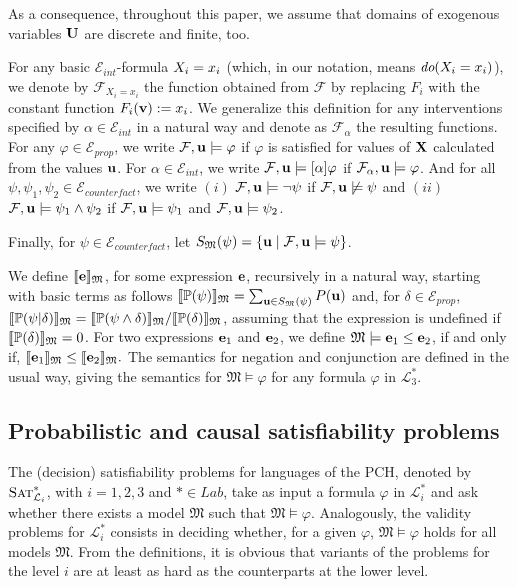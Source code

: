 \documentclass[a4paper,UKenglish,cleveref, autoref, thm-restate]{lipics-v2021}
\newcommand{\compactEquals}[1]{\let\IsInPP=1#1\let\IsInPP=\relax}
\newcommand{\PP}[1]{\mathbb{P}(\compactEquals{#1})}
\newcommand{\cL}{{\mathcal L}}
\newcommand{\cE}{{\mathcal E}}
\newcommand{\cF}{{\mathcal F}}
\newcommand{\fM}{{\mathfrak M}}
\newcommand{\bU}{{\bf U}}
\newcommand{\bX}{{\bf X}}
\newcommand{\be}{{\bf e}}
\newcommand{\bu}{{\bf u}}
\newcommand{\bv}{{\bf v}}
\def\Eprop{\cE_{\textit{prop}}}
\def\Eint{\cE_{\textit{int}}}
\def\Ecounter{\cE_{\textit{counterfact}}}
\def\Lcausalstar{\cL^{*}_{3}}
\def\Listar{\cL^{*}_{i}}
\def\Lab{\textit{Lab}}
\newcommand{\SATistar}{\mbox{\sc Sat}^{*}_{\cL_i}}
\def\mmid{ | }
\def\dop{\textit{do}}
\begin{document}
As a consequence, throughout this paper, we assume that domains of 
exogenous variables $\bU$ are discrete and finite, too.




For any basic  $\Eint$-formula $\let\IsInPP=1 X_i=x_i$ 
(which, in our notation, means $\let\IsInPP=1 \dop(X_i=x_i)$),  we denote 
by $\cF_{X_i=x_i}$ the function obtained from $\cF$ by replacing $F_i$
with the constant function $F_i(\bv):=x_i$. 
We generalize this definition for any interventions specified by
$\alpha\in \Eint$ in a natural way and denote as 
$\cF_{\alpha}$ the resulting functions.
For any $\varphi\in \Eprop$,  we write $\cF, \bu \models \varphi$
if $\varphi$ is satisfied for values of $\bX$ calculated from the values $\bu$.
For $\alpha\in \Eint$, we write $\cF, \bu \models [\alpha]\varphi$ if  
$\cF_{\alpha}, \bu \models \varphi$. And for all $\psi,\psi_1,\psi_2\in \Ecounter$,
we write  $(i)$ $\cF, \bu \models \neg\psi$ if  $\cF, \bu \not\models \psi$ and 
$(ii)$ $\cF, \bu \models \psi_1 \wedge \psi_2$ if  $\cF, \bu \models \psi_1$
and $\cF, \bu \models \psi_2$.
  
Finally, for $\psi\in  \Ecounter$, let $S_{\fM}(\psi)=\{\bu \mid \cF, \bu \models \psi\}$.


We define $\llbracket \be \rrbracket_{\fM}$, for some expression $\be$,
recursively in a natural way, 
starting with basic terms as follows 
$\llbracket \PP{\psi} \rrbracket_{\fM} = \sum_{\bu\in S_{\fM}(\psi)}P(\bu)$
and, for $\delta\in\Eprop$, $\llbracket \PP{\psi\mmid \delta} \rrbracket_{\fM} = \llbracket\PP{\psi \wedge \delta} \rrbracket_{\fM}/ \llbracket\PP{\delta} \rrbracket_{\fM}$, assuming that the expression is undefined if  $\llbracket\PP{\delta} \rrbracket_{\fM}=0$.
For two expressions $\be_1$ and $\be_2$, we define 
$ \fM \models  \be_1 \le  \be_2$,  if and only if, 
$\llbracket \be_1 \rrbracket_{\fM}\le \llbracket \be_2 \rrbracket_{\fM}.$
The semantics for negation and conjunction are defined in the usual way,
giving the semantics for $\fM \models \varphi$ for any formula $\varphi$
in $\Lcausalstar$.

\subsection{Probabilistic and causal satisfiability problems}

The (decision) satisfiability problems for languages of the PCH, denoted by $\SATistar$,  
with $i=1,2,3$ and $*\in \Lab$,
take as input a formula $\varphi$ in 
$\Listar$ and  ask whether there exists a model 
$\fM$ such that $\fM \models\varphi$.
Analogously, the validity problems for $\Listar$ consists in deciding whether, for a given $\varphi$,
$\fM \models\varphi$ holds
for all models  $\fM$.
From the definitions, it is obvious that variants of the problems for the level $i$
are at least as hard as the  counterparts at the lower level. 
\end{document}

